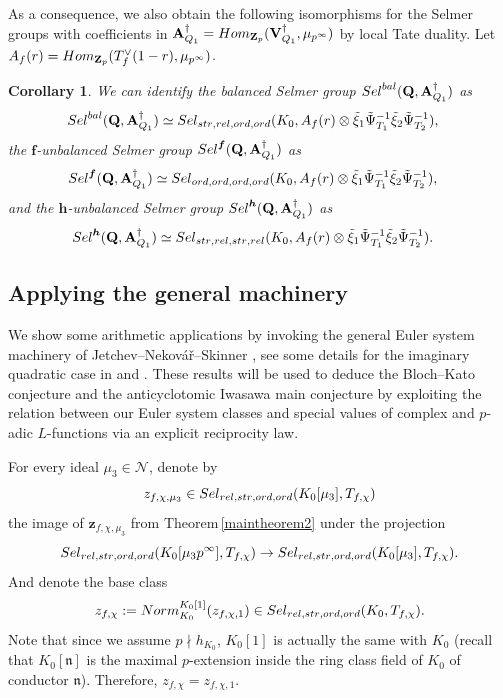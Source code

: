 \documentclass[10pt,letterpaper]{amsart}
\theoremstyle{plain}
\theoremstyle{definition}
\theoremstyle{definition}
\theoremstyle{plain}
\theoremstyle{plain}
\theoremstyle{plain}
\newtheorem{cor}[thm]{Corollary}
\theoremstyle{remark}
\numberwithin{equation}{section}
\newcommand{\ch}{\xi}
\newcommand{\fkn}{\mathfrak{n}}
\newcommand{\relstr}{{{\rm rel},{\rm str}}}
\newcommand{\strrel}{{{\rm str},{\rm rel}}}
\newcommand{\ord}{{{\rm ord},{\rm ord}}}
\newcommand{\Vsdag}{{\mathbf{V}_{Q_1}^\dagger}}
\newcommand{\unb}{{\boldsymbol{f}}}
\newcommand{\Q}{\mathbf{Q}}
\newcommand{\Z}{\mathbf{Z}}
\newcommand{\bfh}{{\boldsymbol{h}}}
\begin{document}
As a consequence, we also obtain the following isomorphisms for the Selmer groups with coefficients in $\mathbf{A}_{Q_1}^\dagger={\rm Hom}_{\Z_p}(\Vsdag,\mu_{p^\infty})$ by local Tate duality. Let $A_f(r)={\rm Hom}_{\Z_p}(T_f^\vee(1-r),\mu_{p^\infty})$.
 

\begin{cor}\label{cor:factor-S} We can identify
the balanced Selmer group ${\rm Sel}^{\rm bal}(\Q,\mathbf{A}_{Q_1}^\dagger)$ as
\begin{align*}
{\rm Sel}^{\rm bal}(\Q,\mathbf{A}_{Q_1}^\dagger)&\simeq{\rm Sel}_{\strrel,\ord}(K_0,A_f(r)\otimes\tilde{\ch}_1\tilde{\Psi}_{T_1}^{-1}\tilde{\ch}_2\tilde{\Psi}_{T_2}^{-1}),
\end{align*}
the $\unb$-unbalanced Selmer group ${\rm Sel}^{\unb}(\Q,\mathbf{A}_{Q_1}^\dagger)$ as
\begin{align*}
{\rm Sel}^{\unb}(\Q,\mathbf{A}_{Q_1}^\dagger)&\simeq
{\rm Sel}_{\ord,\ord}(K_0,A_f(r)\otimes\tilde{\ch}_1\tilde{\Psi}_{T_1}^{-1}\tilde{\ch}_2\tilde{\Psi}_{T_2}^{-1}),
\end{align*}
and the $\bfh$-unbalanced Selmer group ${\rm Sel}^{\bfh}(\Q,\mathbf{A}_{Q_1}^\dagger)$ as
\begin{align*}
{\rm Sel}^{\bfh}(\Q,\mathbf{A}_{Q_1}^\dagger)&\simeq
{\rm Sel}_{\strrel,\strrel}(K_0,A_f(r)\otimes\tilde{\ch}_1\tilde{\Psi}_{T_1}^{-1}\tilde{\ch}_2\tilde{\Psi}_{T_2}^{-1}).
\end{align*}
\end{cor}






\subsection{Applying the general machinery} 
We show some arithmetic applications by invoking the general Euler system machinery of Jetchev--Nekov\'a{\v r}--Skinner  \cite{JNS}, see some details for the imaginary quadratic case in \cite[\S{4.3}]{Do-PhD} and \cite[\S{8}]{ACR}. These results will be used to deduce the Bloch--Kato conjecture and the anticyclotomic Iwasawa main conjecture by exploiting the relation between our Euler system classes and special values of complex and $p$-adic $L$-functions via an explicit reciprocity law.


For every ideal $\mu_3\in \mathcal{N}$, denote by
\[
z_{f,\chi,\mu_3}\in{\rm Sel}_{\relstr,\ord}(K_0[\mu_3],T_{f,\chi})
\]
the image of $\mathbf{z}_{f,\chi,\mu_3}$ from Theorem\,\ref{maintheorem2} under the projection
\begin{equation}\label{eq:Sel_projection_from_K_infty}
    {\rm Sel}_{\relstr,\ord}(K_0[\mu_3p^\infty],T_{f,\chi})\rightarrow{\rm Sel}_{\relstr,\ord}(K_0[\mu_3],T_{f,\chi}).
\end{equation}
And denote the base class
\[
z_{f,\chi}:={\rm Norm}^{K_0[1]}_{K_0}(z_{f,\chi,1})\in{\rm Sel}_{\relstr,\ord}(K_0,T_{f,\chi}).
\]
Note that since we assume $p \nmid h_{K_0}$, $K_0[1]$ is actually the same with $K_0$ (recall that $K_0[\fkn]$ is the maximal $p$-extension inside the ring class field of $K_0$ of conductor $\fkn$). Therefore, $z_{f,\chi}=z_{f,\chi,1}$.
\end{document}
